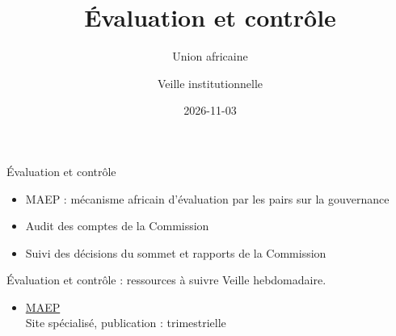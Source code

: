 \documentclass[aspectratio=169,11pt]{beamer}
\title{Évaluation et contrôle}
\subtitle{Union africaine}
\author{Veille institutionnelle}
\date{2026-11-03}
\begin{document}
\begin{frame}\titlepage\end{frame}

\begin{frame}{Évaluation et contrôle}
\begin{itemize}
\item MAEP : mécanisme africain d'évaluation par les pairs sur la gouvernance
\item Audit des comptes de la Commission
\item Suivi des décisions du sommet et rapports de la Commission
\end{itemize}
\end{frame}

\begin{frame}{Évaluation et contrôle : ressources à suivre}
\small
Veille hebdomadaire.
\begin{itemize}
\item \href{https://aprm-au.org}{MAEP}\\{\footnotesize Site spécialisé, publication : trimestrielle}
\end{itemize}
\end{frame}
\end{document}
